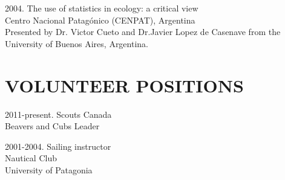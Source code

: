\documentclass{res}
\begin{document}
\begin{resume}
\begin{hangparas}{.4in}{1}
2004. The use of statistics in ecology: a critical view  \\
Centro Nacional Patag\'{o}nico (CENPAT), Argentina\\
Presented by Dr. Victor Cueto and Dr.Javier Lopez de Casenave from the University of Buenos Aires, Argentina.

\end{hangparas}

\section{VOLUNTEER POSITIONS}
\vspace{0.2in}
\begin{hangparas}{.9in}{1}
2011-present. Scouts Canada	\\	
Beavers and Cubs Leader

2001-2004. Sailing instructor \\
Nautical Club\\
University of Patagonia
\end{hangparas}


\end{resume}
\end{document}
